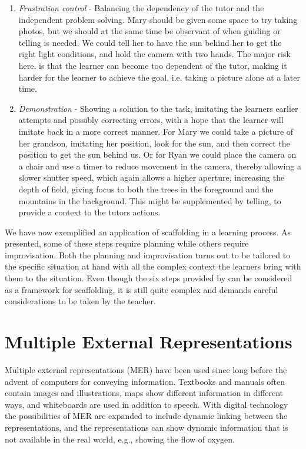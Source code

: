\begin{enumerate}
\item{} \emph{Frustration control} - Balancing the dependency of the tutor and the independent problem solving. Mary should be given some space to try taking photos, but we should at the same time be observant of when guiding or telling is needed. We could tell her to have the sun behind her to get the right light conditions, and hold the camera with two hands. The major risk here, is that the learner can become too dependent of the tutor, making it harder for the learner to achieve the goal, i.e. taking a picture alone at a later time.  
\item{}  \emph{Demonstration} - Showing a solution to the task, imitating the learners earlier attempts and possibly correcting errors, with a hope that the learner will imitate back in a more correct manner. For Mary we could take a picture of her grandson, imitating her position, look for the sun, and then correct the position to get the sun behind us. Or for Ryan we could place the camera on a chair and use a timer to reduce movement in the camera, thereby allowing a slower shutter speed, which again allows a higher aperture, increasing the depth of field, giving focus to both the trees in the foreground and the mountains in the background. This might be supplemented by telling, to provide a context to the tutors actions.
\end{enumerate}

We have now exemplified an application of scaffolding in a learning process. As presented, some of these steps require planning while others require improvisation. Both the planning and improvisation turns out to be tailored to the specific situation at hand with all the complex context the learners bring with them to the situation. Even though the six steps provided by \citet{wood1976role} can be considered as a framework for scaffolding, it is still quite complex and demands careful considerations to be taken by the teacher.  

\section{Multiple External Representations}
Multiple external representations (MER) have been used since long before the advent of computers for conveying information. Textbooks and manuals often contain images and illustrations, maps show different information in different ways, and whiteboards are used in addition to speech. With digital technology the possibilities of MER are expanded to include dynamic linking between the representations, and the representations can show dynamic information that is not available in the real world, e.g., showing the flow of oxygen. 

